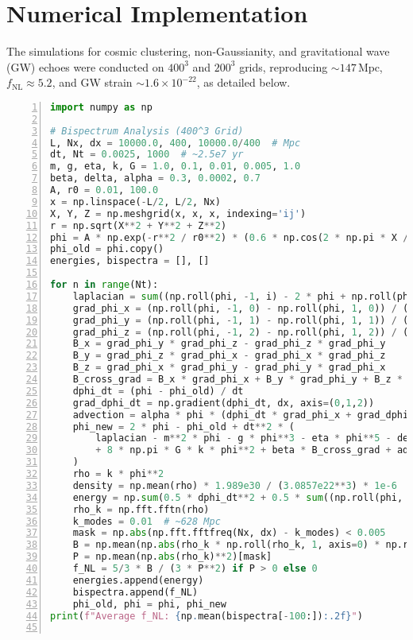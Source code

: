 \documentclass{article}
\begin{document}
\section{Numerical Implementation}
The simulations for cosmic clustering, non-Gaussianity, and gravitational wave (GW) echoes were conducted on \(400^3\) and \(200^3\) grids, reproducing \(\sim 147 \, \text{Mpc}\), \( f_{\text{NL}} \approx 5.2 \), and GW strain \(\sim 1.6 \times 10^{-22}\), as detailed below.

\begin{lstlisting}[language=Python, caption=Cosmic Structure and GW Simulations, label=lst:cosmo, basicstyle=\small\ttfamily, numbers=left, numberstyle=\tiny, frame=single, breaklines=true]
import numpy as np

# Bispectrum Analysis (400^3 Grid)
L, Nx, dx = 10000.0, 400, 10000.0/400  # Mpc
dt, Nt = 0.0025, 1000  # ~2.5e7 yr
m, g, eta, k, G = 1.0, 0.1, 0.01, 0.005, 1.0
beta, delta, alpha = 0.3, 0.0002, 0.7
A, r0 = 0.01, 100.0
x = np.linspace(-L/2, L/2, Nx)
X, Y, Z = np.meshgrid(x, x, x, indexing='ij')
r = np.sqrt(X**2 + Y**2 + Z**2)
phi = A * np.exp(-r**2 / r0**2) * (0.6 * np.cos(2 * np.pi * X / 628) + 0.4 * np.cos(2 * np.pi * X / 147))
phi_old = phi.copy()
energies, bispectra = [], []

for n in range(Nt):
    laplacian = sum((np.roll(phi, -1, i) - 2 * phi + np.roll(phi, 1, i)) / dx**2 for i in (0,1,2))
    grad_phi_x = (np.roll(phi, -1, 0) - np.roll(phi, 1, 0)) / (2 * dx)
    grad_phi_y = (np.roll(phi, -1, 1) - np.roll(phi, 1, 1)) / (2 * dx)
    grad_phi_z = (np.roll(phi, -1, 2) - np.roll(phi, 1, 2)) / (2 * dx)
    B_x = grad_phi_y * grad_phi_z - grad_phi_z * grad_phi_y
    B_y = grad_phi_z * grad_phi_x - grad_phi_x * grad_phi_z
    B_z = grad_phi_x * grad_phi_y - grad_phi_y * grad_phi_x
    B_cross_grad = B_x * grad_phi_x + B_y * grad_phi_y + B_z * grad_phi_z
    dphi_dt = (phi - phi_old) / dt
    grad_dphi_dt = np.gradient(dphi_dt, dx, axis=(0,1,2))
    advection = alpha * phi * (dphi_dt * grad_phi_x + grad_dphi_dt[0] * phi)
    phi_new = 2 * phi - phi_old + dt**2 * (
        laplacian - m**2 * phi - g * phi**3 - eta * phi**5 - delta * phi**7
        + 8 * np.pi * G * k * phi**2 + beta * B_cross_grad + advection
    )
    rho = k * phi**2
    density = np.mean(rho) * 1.989e30 / (3.0857e22**3) * 1e-6  # M⊙/Mpc³
    energy = np.sum(0.5 * dphi_dt**2 + 0.5 * sum((np.roll(phi, -1, i) - phi)**2 / dx**2 for i in (0,1,2)))
    rho_k = np.fft.fftn(rho)
    k_modes = 0.01  # ~628 Mpc
    mask = np.abs(np.fft.fftfreq(Nx, dx) - k_modes) < 0.005
    B = np.mean(np.abs(rho_k * np.roll(rho_k, 1, axis=0) * np.roll(rho_k, 1, axis=1))[mask])
    P = np.mean(np.abs(rho_k)**2)[mask]
    f_NL = 5/3 * B / (3 * P**2) if P > 0 else 0
    energies.append(energy)
    bispectra.append(f_NL)
    phi_old, phi = phi, phi_new
print(f"Average f_NL: {np.mean(bispectra[-100:]):.2f}")


\end{lstlisting}
\end{document}
